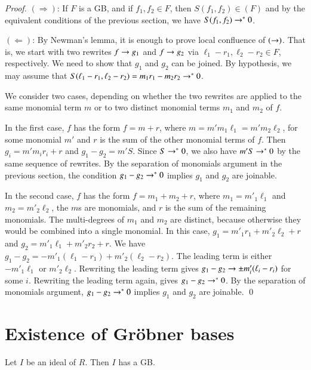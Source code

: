 \documentclass{llncs}
\begin{document}
\begin{proof}
$(\Rightarrow)$: If $F$ is a GB, and if $f_1,f_2\in F$, then $S(f_1,f_2)\in (F)$ and by
the equivalent conditions of the previous section, we have $S(f_1,f_2)\rightarrow^* 0$.

$(\Leftarrow)$: 
By Newman's lemma, it is enough to prove local confluence of $(\rightarrow)$.  That is, we
start with two rewrites $f\rightarrow g_1$ and $f\rightarrow g_2$ via $\ell_1-r_1, \ell_2-r_2\in F$, respectively.  We need to show that $g_1$ and $g_2$ can be joined.  By hypothesis, we may assume that 
$S(\ell_1-r_1,\ell_2-r_2) = m_1 r_1 - m_2 r_2 \rightarrow^* 0$.

We consider two cases, depending on whether the two rewrites are applied to the same monomial term $m$ or to two distinct monomial terms $m_1$ and $m_2$ of $f$.

In the first case, $f$ has the form $f = m + r$, where $m = m' m_1 \ell_1 = m' m_2 \ell_2$, for some monomial $m'$ and $r$ is the sum of the other monomial terms of $f$.  Then $g_i = m' m_i r_i + r$ and
$g_1 - g_2 = m' S$.  Since $S\rightarrow^* 0$, we also have $m' S\rightarrow^* 0$ by the same sequence of rewrites.  By the separation of monomials argument in the previous section, the condition $g_1-g_2 \rightarrow^* 0$ implies $g_1$ and $g_2$ are joinable.

In the second case, $f$ has the form $f = m_1 + m_2 + r$, where $m_1 = m'_1 \ell_1$ and $m_2 = m'_2 \ell_2$, the $m$s are monomials, 
and $r$ is the sum of the remaining monomials.   The multi-degrees of $m_1$ and $m_2$ are distinct, because otherwise they would be combined into a single monomial.  In this case,
$g_1 = m'_1 r_1 + m'_2 \ell_2 + r$ and $g_2 = m'_1 \ell_1 + m'_2 r_2 + r$.
  We have 
$g_1 - g_2 = -m'_1 (\ell_1-r_1) + m'_2 (\ell_2 - r_2)$.  The leading term is either
$-m'_1 \ell_1$ or $m'_2 \ell_2$.  Rewriting the leading term gives
$g_1- g_2 \rightarrow \pm m'_i (\ell_i - r_i)$ for some $i$.   Rewriting the leading term again, gives $g_1-g_2\rightarrow^* 0$.  By the separation of monomials argument, $g_1-g_2\rightarrow^*0$ implies $g_1$ and $g_2$ are joinable.
\qed\end{proof}

\section{Existence of Gr\"obner bases}

\begin{lemma}  Let $I$ be an ideal of $R$.  Then $I$ has a GB.
\end{lemma}
\end{document}
